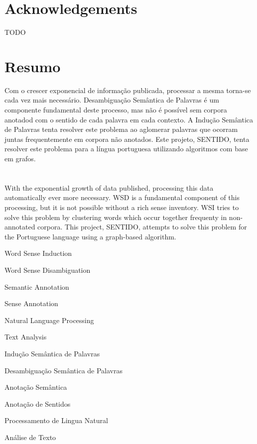 \cleardoublepage
\chapter*{Acknowledgements}
TODO

\cleardoublepage
\chapter*{Resumo}
Com o crescer exponencial de informação publicada, processar a mesma torna-se
cada vez mais necessário. Desambiguação Semântica de Palavras é um componente
fundamental deste processo, mas não é possível sem corpora anotadod com o
sentido de cada palavra em cada contexto. A Indução Semântica de Palavras tenta
resolver este problema ao aglomerar palavras que ocorram juntas frequentemente
em corpora não anotados. Este projeto, \acf*{SENTIDO}, tenta resolver este
problema para a língua portuguesa utilizando algoritmos com base em grafos.

\cleardoublepage
\chapter*{\abstractname}
With the exponential growth of data published, processing this data
automatically ever more necessary. \acf*{WSD} is a fundamental component of this
processing, but it is not possible without a rich sense inventory. \acf*{WSI}
tries to solve this problem by clustering words which occur together frequenty
in non-annotated corpora. This project, \acf*{SENTIDO}, attempts to solve this
problem for the Portuguese language using a graph-based algorithm.

\cleardoublepage
{}
\begin{keywords}
Word Sense Induction

Word Sense Disambiguation

Semantic Annotation

Sense Annotation

Natural Language Processing

Text Analysis

\bigskip
\bigskip
Indução Semântica de Palavras

Desambiguação Semântica de Palavras

Anotação Semântica

Anotação de Sentidos

Processamento de Lingua Natural

Análise de Texto

\end{keywords}

